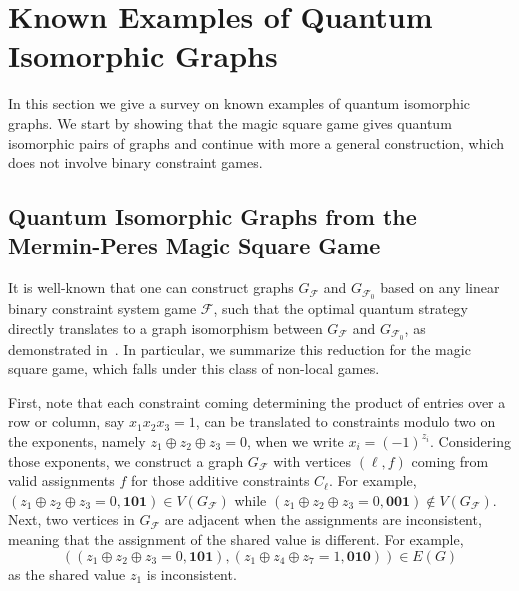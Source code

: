 \section{Known Examples of Quantum Isomorphic Graphs}
In this section we give a survey on known examples of
quantum isomorphic graphs.
We start by showing that the magic square game
gives quantum isomorphic pairs of graphs and continue
with more a general construction, which does not involve 
binary constraint games.

\subsection{Quantum Isomorphic Graphs from the Mermin-Peres Magic Square Game}

It is well-known that one can construct graphs $G_\mathcal{F}$ and $G_{\mathcal{F}_0}$
based on any linear binary constraint system game $\mathcal{F}$,
such that the optimal quantum strategy directly translates to a graph isomorphism between $G_\mathcal{F}$ and $G_{\mathcal{F}_0}$,
as demonstrated in~\cite{atserias2017quantumnonsignallinggraphisomorphisms}.
In particular, we summarize this reduction for the magic square game, which falls under this class of non-local games.

First, note that each constraint coming determining the product of entries over a row or column,
say $x_1 x_2 x_3 = 1$, can be translated to constraints modulo two on the exponents,
namely $z_1 \oplus z_2 \oplus z_3 = 0$, when we write $x_i = (-1)^{z_i}$.
Considering those exponents, we construct a graph $G_\mathcal{F}$ with vertices $(\ell, f)$
coming from valid assignments $f$ for those additive constraints $C_\ell$.
For example, $(z_1 \oplus z_2 \oplus z_3 = 0, \mathbf{101}) \in V(G_\mathcal{F})$
while $(z_1 \oplus z_2 \oplus z_3 = 0, \mathbf{001}) \not \in V(G_\mathcal{F})$.
%
Next, two vertices in $G_\mathcal{F}$ are adjacent when the assignments are inconsistent, meaning that 
the assignment of the shared value is different. For example,
\[ \left((z_1 \oplus z_2 \oplus z_3 = 0, \mathbf{101}), (z_1 \oplus z_4 \oplus z_7 = 1, \mathbf{010})\right) \in E(G) \]
as the shared value $z_1$ is inconsistent.

